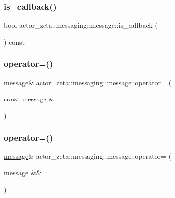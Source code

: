 \subsubsection{\texorpdfstring{is\+\_\+callback()}{is\_callback()}}
{\footnotesize\ttfamily bool actor\+\_\+zeta\+::messaging\+::message\+::is\+\_\+callback (\begin{DoxyParamCaption}{ }\end{DoxyParamCaption}) const}

\mbox{\label{classactor__zeta_1_1messaging_1_1message_a3829befdc05243773eb02668c830a25a}} 
\subsubsection{\texorpdfstring{operator=()}{operator=()}\hspace{0.1cm}{\footnotesize\ttfamily [1/2]}}
{\footnotesize\ttfamily \hyperlink{classactor__zeta_1_1messaging_1_1message}{message}\& actor\+\_\+zeta\+::messaging\+::message\+::operator= (\begin{DoxyParamCaption}\item[{const \hyperlink{classactor__zeta_1_1messaging_1_1message}{message} \&}]{ }\end{DoxyParamCaption})\hspace{0.3cm}{\ttfamily [delete]}}

\mbox{\label{classactor__zeta_1_1messaging_1_1message_a3cfe617e41808c075afa2dbd32ea9ef4}} 
\subsubsection{\texorpdfstring{operator=()}{operator=()}\hspace{0.1cm}{\footnotesize\ttfamily [2/2]}}
{\footnotesize\ttfamily \hyperlink{classactor__zeta_1_1messaging_1_1message}{message}\& actor\+\_\+zeta\+::messaging\+::message\+::operator= (\begin{DoxyParamCaption}\item[{\hyperlink{classactor__zeta_1_1messaging_1_1message}{message} \&\&}]{ }\end{DoxyParamCaption})\hspace{0.3cm}{\ttfamily [default]}}

